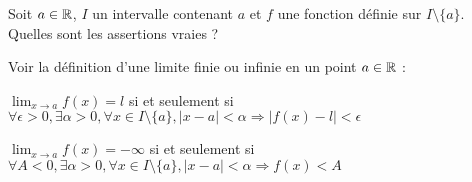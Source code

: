 \begin{question} 
Soit $a\in \mathbb{R}$, $I$ un intervalle contenant $a$ et $f$ une fonction définie sur $I \setminus\{a\}$. Quelles sont les assertions vraies ?
\begin{answers}

    
    
    
    
\end{answers}
\begin{explanations}
Voir la définition d'une limite finie ou infinie en un point $a\in\mathbb{R}$ :

 $\lim_{x\to a} f(x)=l$ si et seulement si  $\forall \epsilon >0,  \exists \alpha > 0, \forall x \in I\setminus\{a\}, |x-a| < \alpha \Rightarrow |f(x)-l|<\epsilon$
 
 $\lim_{x\to a} f(x)=-\infty$ si et seulement si $\forall A < 0,  \exists \alpha > 0, \forall x \in I\setminus\{a\}, |x-a| < \alpha \Rightarrow f(x) < A$
 
\end{explanations}

\end{question}


